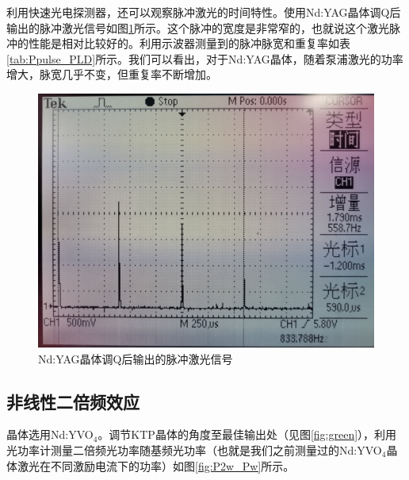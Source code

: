 \documentclass{mpltx}
\begin{document}
利用快速光电探测器，还可以观察脉冲激光的时间特性。使用Nd:YAG晶体调Q后输出的脉冲激光信号如图\ref{fig:pulse}所示。这个脉冲的宽度是非常窄的，也就说这个激光脉冲的性能是相对比较好的。利用示波器测量到的脉冲脉宽和重复率如表\ref{tab:Ppulse_PLD}所示。我们可以看出，对于Nd:YAG晶体，随着泵浦激光的功率增大，脉宽几乎不变，但重复率不断增加。
\begin{figure}[h]
  \centering
  \includegraphics[width=0.5\linewidth]{fig/pulse.png}
  \caption{Nd:YAG晶体调Q后输出的脉冲激光信号}
  \label{fig:pulse}
\end{figure}
\begin{table}[h]
  \centering
  \caption{Nd:YAG晶体调Q产生的脉冲脉宽和重复率随激励电流的变化。脉冲宽度基本不随着激励电流的变化而变化，但是重复率随着激励电流的增加不断增加。}
  \label{tab:Ppulse_PLD}
\end{table}
\subsection{非线性二倍频效应}
晶体选用Nd:YVO$_4$。调节KTP晶体的角度至最佳输出处（见图\ref{fig:green}），利用光功率计测量二倍频光功率随基频光功率（也就是我们之前测量过的Nd:YVO$_4$晶体激光在不同激励电流下的功率）如图\ref{fig:P2w_Pw}所示。
\end{document}
